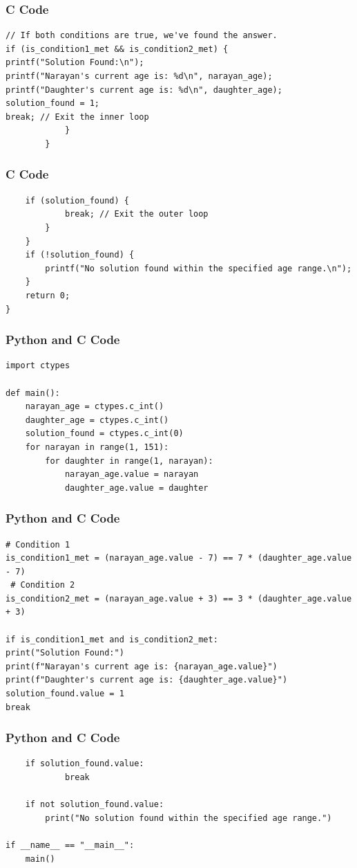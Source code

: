 \documentclass{beamer}
\begin{document}
\begin{frame}[fragile]
\frametitle{C Code}
\begin{lstlisting}
// If both conditions are true, we've found the answer.
if (is_condition1_met && is_condition2_met) {
printf("Solution Found:\n");
printf("Narayan's current age is: %d\n", narayan_age);
printf("Daughter's current age is: %d\n", daughter_age);
solution_found = 1;
break; // Exit the inner loop
            }
        }
\end{lstlisting}
\end{frame}

\begin{frame}[fragile]
\frametitle{C Code}
\begin{lstlisting}
    if (solution_found) {
            break; // Exit the outer loop
        }
    }
    if (!solution_found) {
        printf("No solution found within the specified age range.\n");
    }
    return 0;
}
\end{lstlisting}
\end{frame}

\begin{frame}[fragile]
\frametitle{Python and C Code}
\begin{lstlisting}
import ctypes

def main():
    narayan_age = ctypes.c_int()
    daughter_age = ctypes.c_int()
    solution_found = ctypes.c_int(0)
    for narayan in range(1, 151):
        for daughter in range(1, narayan):
            narayan_age.value = narayan
            daughter_age.value = daughter
\end{lstlisting}
\end{frame}

\begin{frame}[fragile]
\frametitle{Python and C Code}
\begin{lstlisting}
# Condition 1
is_condition1_met = (narayan_age.value - 7) == 7 * (daughter_age.value - 7)
 # Condition 2
is_condition2_met = (narayan_age.value + 3) == 3 * (daughter_age.value + 3)

if is_condition1_met and is_condition2_met:
print("Solution Found:")
print(f"Narayan's current age is: {narayan_age.value}")
print(f"Daughter's current age is: {daughter_age.value}")
solution_found.value = 1
break
\end{lstlisting}
\end{frame}

\begin{frame}[fragile]
\frametitle{Python and C Code}
\begin{lstlisting}
    if solution_found.value:
            break

    if not solution_found.value:
        print("No solution found within the specified age range.")

if __name__ == "__main__":
    main()

\end{lstlisting}
\end{frame}
\end{document}
